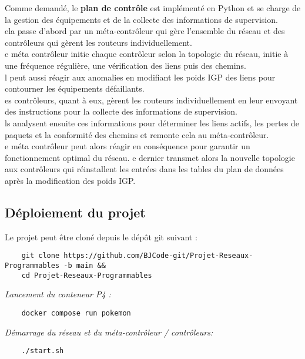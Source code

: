 \documentclass[12pt,a4paper]{report}
\newcommand*\sectiontitle{}
\let\origsection\section
\renewcommand*{\section}[2][]{%
\ifx\setminus#1\setminus%
  \origsection{#2}%
  \renewcommand*\sectiontitle{#2}%
\else
  \origsection[#1]{#2}%
  \renewcommand*\sectiontitle{#1}%
\fi
}
\begin{document}
    \begin{card}
        Comme demandé, le \textbf{plan de contrôle} est implémenté en Python et se charge de la gestion des équipements et de la collecte des informations de supervision. \\
        ela passe d'abord par un méta-contrôleur qui gère l'ensemble du réseau et des contrôleurs qui gèrent les routeurs individuellement. \\
        e méta contrôleur initie chaque contrôleur selon la topologie du réseau, initie à une fréquence régulière, une vérification des liens puis des chemins. \\
        l peut aussi réagir aux anomalies en modifiant les poids IGP des liens pour contourner les équipements défaillants. \\
        es contrôleurs, quant à eux, gèrent les routeurs individuellement en leur envoyant des instructions pour la collecte des informations de supervision. \\
        ls analysent ensuite ces informations pour déterminer les liens actifs, les pertes de paquets et la conformité des chemins et remonte cela au méta-contrôleur. \\
        e méta contrôleur peut alors réagir en conséquence pour garantir un fonctionnement optimal du réseau.
        e dernier transmet alors la nouvelle topologie aux contrôleurs qui réinstallent les entrées dans les tables du plan de données après la modification des poids IGP.
    \end{card}




\newpage

\subsection{Déploiement du projet}


Le projet peut être cloné depuis le dépôt git suivant : 
\begin{card}
    \begin{verbatim}
    git clone https://github.com/BJCode-git/Projet-Reseaux-Programmables -b main &&
    cd Projet-Reseaux-Programmables
\end{verbatim}
\end{card}


\emph{Lancement du conteneur P4 :}

\begin{card}
\begin{verbatim}
    docker compose run pokemon
\end{verbatim}
\end{card}

\emph{Démarrage du réseau  et du méta-contrôleur / contrôleurs:}

\begin{card}
    \begin{verbatim}
    ./start.sh
    \end{verbatim}
\end{card}
\end{document}
